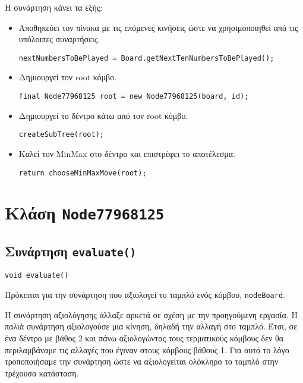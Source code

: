 Η συνάρτηση κάνει τα εξής:
\begin{itemize}
\item Αποθηκεύει τον πίνακα με τις επόμενες κινήσεις ώστε να χρησιμοποιηθεί από τις υπόλοιπες συναρτήσεις.
\begin{lstlisting}[style=chunk]
nextNumbersToBePlayed = Board.getNextTenNumbersToBePlayed();
\end{lstlisting}

\item Δημιουργεί τον root κόμβο.
\begin{lstlisting}[style=chunk]
final Node77968125 root = new Node77968125(board, id);
\end{lstlisting}

\item Δημιουργεί το δέντρο κάτω από τον root κόμβο.
\begin{lstlisting}[style=chunk]
createSubTree(root);
\end{lstlisting}

\item Καλεί τον MinMax στο δέντρο και επιστρέφει το αποτέλεσμα.
\begin{lstlisting}[style=chunk]
return chooseMinMaxMove(root);
\end{lstlisting}
\end{itemize}

\section{Κλάση \texttt{Node77968125}}
\subsection{Συνάρτηση \texttt{evaluate()}}
\begin{lstlisting}[style=declaration]
void evaluate()
\end{lstlisting}
Πρόκειται για την συνάρτηση που αξιολογεί το ταμπλό ενός κόμβου, \lstinline!nodeBoard!.

Η συνάρτηση αξιολόγησης άλλαξε αρκετά σε σχέση με την προηγούμενη εργασία.
Η παλιά συνάρτηση αξιολογούσε μια κίνηση, δηλαδή την αλλαγή στο ταμπλό.
Έτσι, σε ένα δέντρο με βάθος 2 και πάνω αξιολογώντας τους τερματικούς κόμβους δεν θα περιλαμβάναμε τις αλλαγές που έγιναν στους κόμβους βάθους 1.
Για αυτό το λόγο τροποποιήσαμε την συνάρτηση ώστε να αξιολογείται ολόκληρο το ταμπλό στην τρέχουσα κατάσταση.

